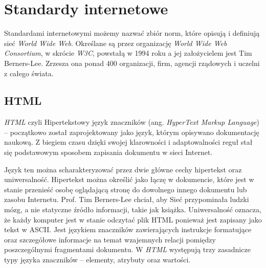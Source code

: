 \documentclass{iiuwb}
\begin{document}
\section{Standardy internetowe}

Standardami internetowymi możemy nazwać zbiór norm, które opisują i definiują sieć \textit{World Wide Web}. Określane są przez organizację \textit{World Wide Web Consortium}, w skrócie \textit{W3C}, powstałą w 1994 roku a jej założycielem jest Tim Berners-Lee. Zrzesza ona ponad 400 organizacji, firm, agencji rządowych i uczelni z całego świata. 

\subsection{HTML}

\textit{HTML} \cite{Berjon:14:H} czyli Hipertekstowy język znaczników (ang. \textit{HyperText Markup Language}) -- początkowo został zaprojektowany jako język, którym opisywano dokumentację naukową. Z biegiem czasu dzięki swojej klarowności i adaptowalności reguł  stał się podstawowym sposobem zapisania dokumentu w sieci Internet. 

Język ten można scharakteryzować przez dwie główne cechy hipertekst oraz uniwersalność. Hipertekst można określić jako łączę w dokumencie, które jest w stanie przenieść osobę oglądającą stronę do dowolnego innego dokumentu lub zasobu Internetu. Prof. Tim Berners-Lee chciał, aby Sieć przypominała ludzki mózg, a nie statyczne źródło informacji, takie jak książka. Uniwersalność oznacza, że każdy komputer jest w stanie odczytać plik HTML ponieważ jest zapisany jako tekst w ASCII. Jest językiem znaczników zawierających instrukcje formatujące oraz szczegółowe informacje na temat wzajemnych relacji pomiędzy poszczególnymi fragmentami dokumentu. W \textit{HTML} występują trzy zasadnicze typy języka znaczników -- elementy, atrybuty oraz wartości.
\end{document}

